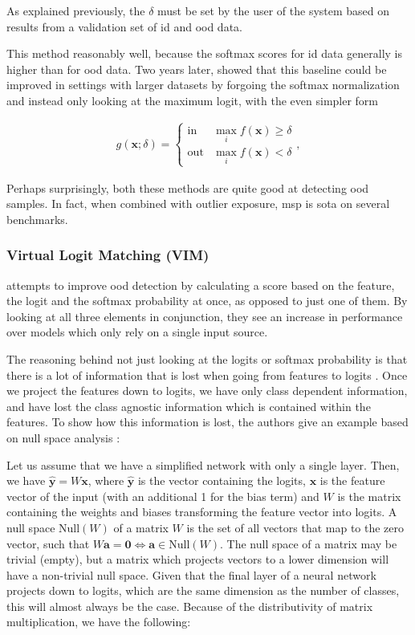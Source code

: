 \documentclass[UKenglish]{uiomasterthesis} %
\theoremstyle{definition}
\begin{document}
\noindent As explained previously, the $\delta$ must be set by the user of the system based on results from a validation set of \ac{id} and \ac{ood} data.

This method reasonably well, because the softmax scores for \ac{id} data generally is higher than for \ac{ood} data. Two years later, \cite{mls} showed that this baseline could be improved in settings with larger datasets by forgoing the softmax normalization and instead only looking at the maximum logit, with the even simpler form

\begin{align}
\label{eq:mls}
    g(\bm{x}; \delta)=\begin{cases} 
        \text{in } & \max_i f(\bm{x})\ge \delta \\
        \text{out} & \max_i f(\bm{x}) < \delta 
   \end{cases},
\end{align}

\noindent Perhaps surprisingly, both these methods are quite good at detecting \ac{ood} samples. In fact, when combined with outlier exposure, \ac{msp} is \ac{sota} on several benchmarks.

\subsubsection{Virtual Logit Matching (VIM)} \label{section:vim}

\cite{vim} attempts to improve \ac{ood} detection by calculating a score based on the feature, the logit and the softmax probability at once, as opposed to just one of them. By looking at all three elements in conjunction, they see an increase in performance over models which only rely on a single input source.

The reasoning behind not just looking at the logits or softmax probability is that there is a lot of information that is lost when going from features to logits \cite{vim}. Once we project the features down to logits, we have only class dependent information, and have lost the class agnostic information which is contained within the features. To show how this information is lost, the authors give an example based on null space analysis \cite{nusa}:

Let us assume that we have a simplified network with only a single layer. Then, we have $\hat{\bm{y}} = W \bm{x}$, where $\hat{\bm{y}}$ is the vector containing the logits, $\bm{x}$ is the feature vector of the input (with an additional 1 for the bias term) and $W$ is the matrix containing the weights and biases transforming the feature vector into logits. A null space $\text{Null}(W)$ of a matrix $W$ is the set of all vectors that map to the zero vector, such that $W \bm{a} = \bm{0} \iff \bm{a} \in \text{Null}(W)$. The null space of a matrix may be trivial (empty), but a matrix which projects vectors to a lower dimension will have a non-trivial null space. Given that the final layer of a neural network projects down to logits, which are the same dimension as the number of classes, this will almost always be the case. Because of the distributivity of matrix multiplication, we have the following:
\end{document}
